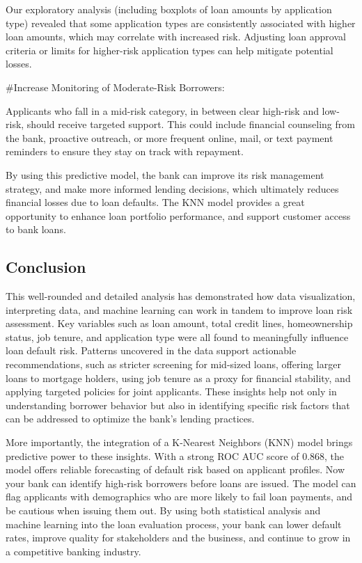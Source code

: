 \documentclass[
]{article}
\begin{document}
Our exploratory analysis (including boxplots of loan amounts by
application type) revealed that some application types are consistently
associated with higher loan amounts, which may correlate with increased
risk. Adjusting loan approval criteria or limits for higher-risk
application types can help mitigate potential losses.

\#Increase Monitoring of Moderate-Risk Borrowers:

Applicants who fall in a mid-risk category, in between clear high-risk
and low-risk, should receive targeted support. This could include
financial counseling from the bank, proactive outreach, or more frequent
online, mail, or text payment reminders to ensure they stay on track
with repayment.

By using this predictive model, the bank can improve its risk management
strategy, and make more informed lending decisions, which ultimately
reduces financial losses due to loan defaults. The KNN model provides a
great opportunity to enhance loan portfolio performance, and support
customer access to bank loans.

\subsection{Conclusion}\label{conclusion}

This well-rounded and detailed analysis has demonstrated how data
visualization, interpreting data, and machine learning can work in
tandem to improve loan risk assessment. Key variables such as loan
amount, total credit lines, homeownership status, job tenure, and
application type were all found to meaningfully influence loan default
risk. Patterns uncovered in the data support actionable recommendations,
such as stricter screening for mid-sized loans, offering larger loans to
mortgage holders, using job tenure as a proxy for financial stability,
and applying targeted policies for joint applicants. These insights help
not only in understanding borrower behavior but also in identifying
specific risk factors that can be addressed to optimize the bank's
lending practices.

More importantly, the integration of a K-Nearest Neighbors (KNN) model
brings predictive power to these insights. With a strong ROC AUC score
of 0.868, the model offers reliable forecasting of default risk based on
applicant profiles. Now your bank can identify high-risk borrowers
before loans are issued. The model can flag applicants with demographics
who are more likely to fail loan payments, and be cautious when issuing
them out. By using both statistical analysis and machine learning into
the loan evaluation process, your bank can lower default rates, improve
quality for stakeholders and the business, and continue to grow in a
competitive banking industry.
\end{document}
